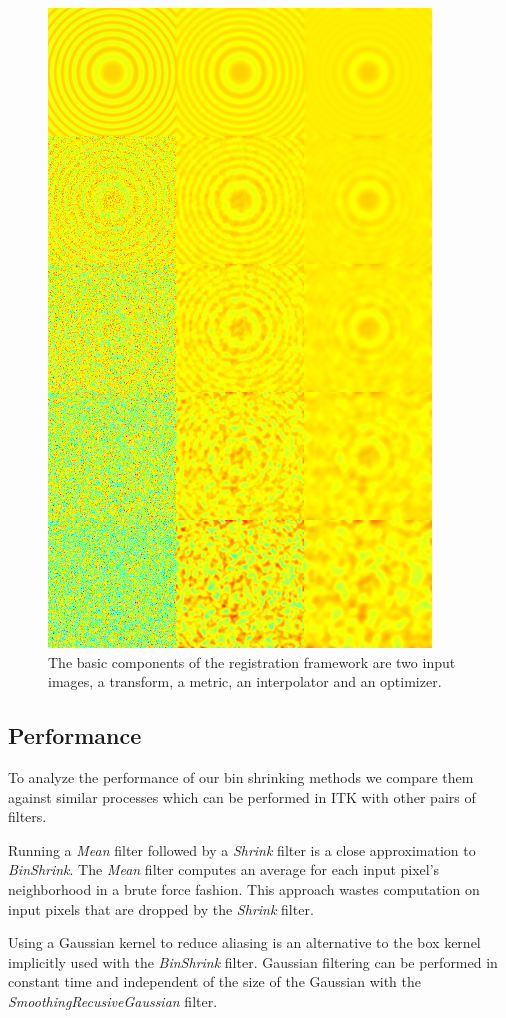 \documentclass{InsightArticle}
\begin{document}
\begin{figure}
  \centering
  \includegraphics[width=0.4\linewidth]{images/gaussianshrink_hot.png}
  \caption[Registration Framework Components]{The basic components of the
    registration framework are two input images, a transform, a metric, an
    interpolator and an optimizer.}
  \label{fig:GaussianShrinkComparison}
\end{figure}

\subsection{Performance}

To analyze the performance of our bin shrinking methods we compare them
against similar processes which can be performed in ITK with other pairs of filters.

Running a \textit{Mean} filter followed by a \textit{Shrink} filter is a
close approximation to \textit{BinShrink}. The
\textit{Mean} filter computes an average for each input pixel's
neighborhood in a brute force fashion. This approach wastes computation on input
pixels that are dropped by the \textit{Shrink} filter.

Using a Gaussian kernel to reduce aliasing is an alternative to the box
kernel implicitly used with the \textit{BinShrink} filter. Gaussian filtering can be
performed in constant time and independent of the size of the Gaussian with
the \textit{SmoothingRecusiveGaussian} filter.
\end{document}
